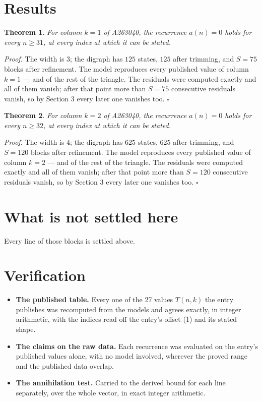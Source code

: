 \documentclass[11pt]{article}
\newtheorem{theorem}{Theorem}
\theoremstyle{definition}
\begin{document}
\section{Results}

\begin{theorem} For column $k = 1$ of A263040, the recurrence $a(n) = 0$ holds for every $n \ge 31$, at every index at which it can be stated.\end{theorem}

{\itshape Proof.} The width is $3$; the digraph has $125$ states, $125$ after trimming, and $S = 75$ blocks after refinement. The model reproduces every published value of column $k = 1$ --- and of the rest of the triangle. The residuals were computed exactly and all of them vanish; after that point more than $S = 75$ consecutive residuals vanish, so by Section 3 every later one vanishes too. $\square$

\begin{theorem} For column $k = 2$ of A263040, the recurrence $a(n) = 0$ holds for every $n \ge 32$, at every index at which it can be stated.\end{theorem}

{\itshape Proof.} The width is $4$; the digraph has $625$ states, $625$ after trimming, and $S = 120$ blocks after refinement. The model reproduces every published value of column $k = 2$ --- and of the rest of the triangle. The residuals were computed exactly and all of them vanish; after that point more than $S = 120$ consecutive residuals vanish, so by Section 3 every later one vanishes too. $\square$

\section{What is not settled here}

Every line of those blocks is settled above.

\section{Verification}

\begin{itemize}

\item {\bfseries The published table.} Every one of the 27 values $T(n,k)$ the entry publishes was recomputed from the models and agrees exactly, in integer arithmetic, with the indices read off the entry's offset (1) and its stated shape.

\item {\bfseries The claims on the raw data.} Each recurrence was evaluated on the entry's published values alone, with no model involved, wherever the proved range and the published data overlap.

\item {\bfseries The annihilation test.} Carried to the derived bound for each line separately, over the whole vector, in exact integer arithmetic.

\end{itemize}
\end{document}
